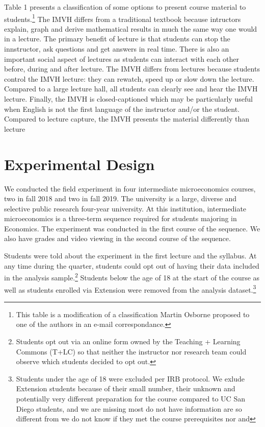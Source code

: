 \documentclass[12pt]{article}
\begin{document}
Table 1 presents a classification of some options to present course material to students.\footnote{This table is a modification of a classification Martin Osborne proposed to one of the authors in an e-mail correspondance.} The IMVH differs from a traditional textbook because intructors explain, graph and derive mathematical results in much the same way one would in a lecture. The primary benefit of lecture is that students can stop the innstructor, ask questions and get answers in real time. There is also an important social aspect of lectures as students can interact with each other before, during and after lecture. The IMVH differs from lectures because students control the IMVH lecture: they can rewatch, speed up or slow down the lecture. Compared to a large lecture hall, all students can clearly see and hear the IMVH lecture. Finally, the IMVH is closed-captioned which may be particularly useful when English is not the first language of the instructor and/or the student. Compared to lecture capture, the IMVH presents the material differently than lecture


\section{Experimental Design} \label{expdesign}
We conducted the field experiment in four intermediate microeconomics courses, two in fall 2018 and two in fall 2019. The university is a large, diverse and selective public research four-year university. At this institution, intermediate microeconomics is a three-term sequence required for students majoring in Economics. The experiment was conducted in the first course of the sequence. We also have grades and video viewing in the second course of the sequence.

Students were told about the experiment in the first lecture and the syllabus. At any time during the quarter, students could opt out of having their data included in the analysis sample.\footnote{Students opt out via an online form owned by the Teaching + Learning Commons (T+LC) so that neither the instructor nor research team could observe which students decided to opt out.} Students below the age of 18 at the start of the course as well as students enrolled via Extension were removed from the analysis dataset.\footnote{Students under the age of 18 were excluded per IRB protocol. We exlude Extension students because of their small number, their unknown and potentially very different preparation for the course compared to UC San Diego students, and we are missing most do not have information are so different from we do not know if they met the course prerequisites nor and }
\end{document}
